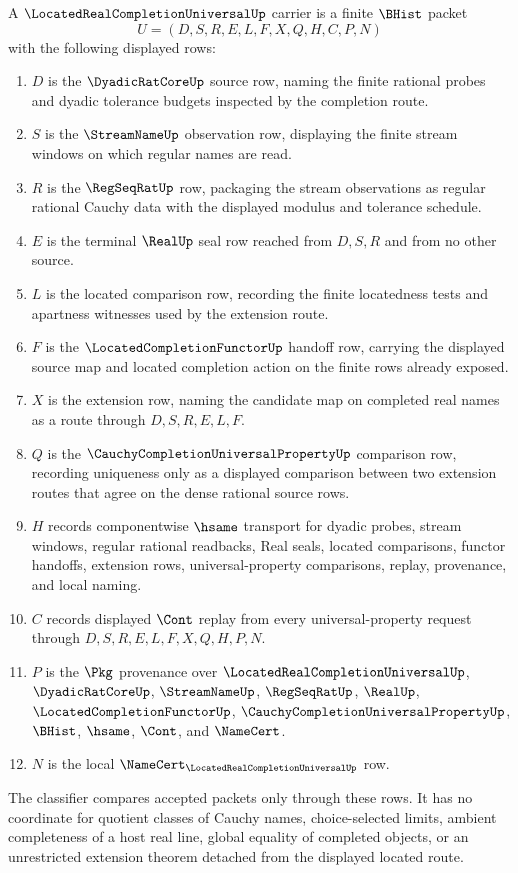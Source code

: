 \begin{definition}
\label{def:located-real-completion-universal-carrier}
A $\LocatedRealCompletionUniversalUp$ carrier is a finite $\BHist$ packet
$$
U=(D,S,R,E,L,F,X,Q,H,C,P,N)
$$
with the following displayed rows:
\begin{enumerate}
\item $D$ is the $\DyadicRatCoreUp$ source row, naming the finite rational probes and dyadic tolerance budgets inspected by the completion route.
\item $S$ is the $\StreamNameUp$ observation row, displaying the finite stream windows on which regular names are read.
\item $R$ is the $\RegSeqRatUp$ row, packaging the stream observations as regular rational Cauchy data with the displayed modulus and tolerance schedule.
\item $E$ is the terminal $\RealUp$ seal row reached from $D,S,R$ and from no other source.
\item $L$ is the located comparison row, recording the finite locatedness tests and apartness witnesses used by the extension route.
\item $F$ is the $\LocatedCompletionFunctorUp$ handoff row, carrying the displayed source map and located completion action on the finite rows already exposed.
\item $X$ is the extension row, naming the candidate map on completed real names as a route through $D,S,R,E,L,F$.
\item $Q$ is the $\CauchyCompletionUniversalPropertyUp$ comparison row, recording uniqueness only as a displayed comparison between two extension routes that agree on the dense rational source rows.
\item $H$ records componentwise $\hsame$ transport for dyadic probes, stream windows, regular rational readbacks, Real seals, located comparisons, functor handoffs, extension rows, universal-property comparisons, replay, provenance, and local naming.
\item $C$ records displayed $\Cont$ replay from every universal-property request through $D,S,R,E,L,F,X,Q,H,P,N$.
\item $P$ is the $\Pkg$ provenance over $\LocatedRealCompletionUniversalUp$, $\DyadicRatCoreUp$, $\StreamNameUp$, $\RegSeqRatUp$, $\RealUp$, $\LocatedCompletionFunctorUp$, $\CauchyCompletionUniversalPropertyUp$, $\BHist$, $\hsame$, $\Cont$, and $\NameCert$.
\item $N$ is the local $\NameCert_{\LocatedRealCompletionUniversalUp}$ row.
\end{enumerate}
The classifier compares accepted packets only through these rows. It has no coordinate for quotient classes of Cauchy names, choice-selected limits, ambient completeness of a host real line, global equality of completed objects, or an unrestricted extension theorem detached from the displayed located route.
\end{definition}

